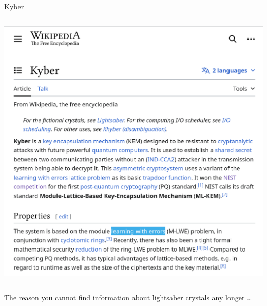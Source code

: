 \documentclass[xcolor=table,10pt,aspectratio=169]{beamer}
\begin{document}
\begin{frame}[label={sec:orgef6af93}]{Kyber}
\begin{columns}[t]
\begin{column}{0.5\columnwidth}
\begin{center}
\includegraphics[keepaspectratio,height=.75\textheight]{./kyber.png}
\end{center}
\end{column}
\end{columns}

The reason you cannot find information about lightsaber crystals any longer …
\end{frame}
\end{document}
